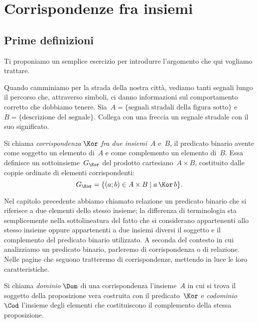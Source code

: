 
\chapter{Corrispondenze fra insiemi}

\section{Prime definizioni}

Ti proponiamo un semplice esercizio per introdurre l'argomento che qui vogliamo trattare.

Quando camminiamo per la strada della nostra città, vediamo tanti segnali lungo il percorso che, attraverso simboli,
ci danno informazioni sul comportamento corretto che dobbiamo tenere. Sia~$A= \{\text{segnali stradali della figura sotto}\}$ e~$B= \{\text{descrizione del segnale}\}$.
Collega con una freccia un segnale stradale con il suo significato.
\begin{center}
 
\end{center}

\begin{definizione}
Si chiama \emph{corrispondenza} $\Kor$ \emph{fra due insiemi}~$A$ e~$B$, il predicato binario avente come soggetto un elemento di~$A$ e come complemento un elemento di~$B$.
Essa definisce un sottoinsieme~$G_\Kor$ del prodotto cartesiano~$A \times B$, costituito dalle coppie ordinate di elementi corrispondenti:
\[ G_\Kor=\{(a;b)\in A \times B \mid  a \,\Kor\, b \}.\]
\end{definizione}

\osservazione
Nel capitolo precedente abbiamo chiamato relazione un predicato binario che si riferisce a due elementi dello stesso insieme; la differenza di terminologia
sta semplicemente nella sottolineatura del fatto che si considerano appartenenti allo stesso insieme oppure appartenenti a due insiemi diversi il soggetto
e il complemento del predicato binario utilizzato.
A seconda del contesto in cui analizziamo un predicato binario, parleremo di corrispondenza o di relazione. Nelle pagine che seguono tratteremo di corrispondenze,
mettendo in luce le loro caratteristiche.

\begin{definizione}
Si chiama \emph{dominio} $\Dom$ di una corrispondenza l'insieme~$A$ in cui si trova il soggetto della proposizione vera costruita con il predicato~$\Kor$ e \emph{codominio}~$\Cod$
l'insieme degli elementi che costituiscono il complemento della stessa proposizione.
\end{definizione}

